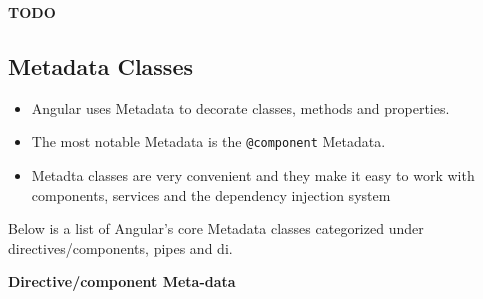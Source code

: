 \documentclass[12pt,]{article}
\providecommand{\tightlist}{%
  \setlength{\itemsep}{0pt}\setlength{\parskip}{0pt}}
\begin{document}
\textbf{TODO}

\subsection{Metadata Classes}\label{metadata-classes}

\begin{itemize}
\tightlist
\item
  Angular uses Metadata to decorate classes, methods and properties.
\item
  The most notable Metadata is the \texttt{@component} Metadata.
\item
  Metadta classes are very convenient and they make it easy to work with
  components, services and the dependency injection system
\end{itemize}

Below is a list of Angular's core Metadata classes categorized under
directives/components, pipes and di.

\textbf{Directive/component Meta-data}
\end{document}
